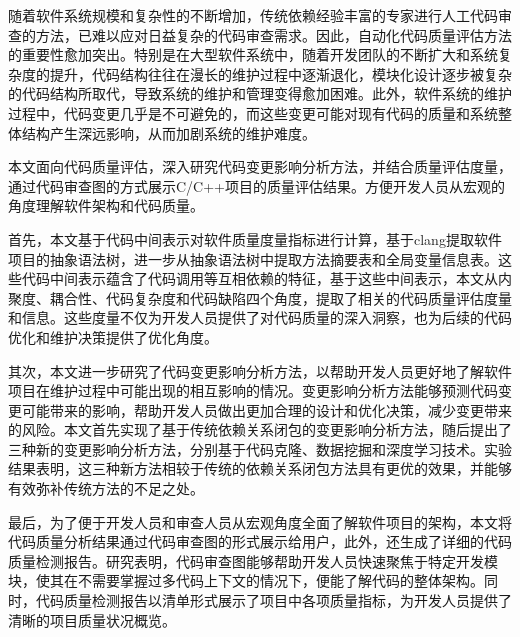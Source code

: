 \begin{cabstract}

  随着软件系统规模和复杂性的不断增加，传统依赖经验丰富的专家进行人工代码审查的方法，已难以应对日益复杂的代码审查需求。因此，自动化代码质量评估方法的重要性愈加突出。特别是在大型软件系统中，随着开发团队的不断扩大和系统复杂度的提升，代码结构往往在漫长的维护过程中逐渐退化，模块化设计逐步被复杂的代码结构所取代，导致系统的维护和管理变得愈加困难。此外，软件系统的维护过程中，代码变更几乎是不可避免的，而这些变更可能对现有代码的质量和系统整体结构产生深远影响，从而加剧系统的维护难度。

  本文面向代码质量评估，深入研究代码变更影响分析方法，并结合质量评估度量，通过代码审查图的方式展示C/C++项目的质量评估结果。方便开发人员从宏观的角度理解软件架构和代码质量。

  首先，本文基于代码中间表示对软件质量度量指标进行计算，基于clang提取软件项目的抽象语法树，进一步从抽象语法树中提取方法摘要表和全局变量信息表。这些代码中间表示蕴含了代码调用等互相依赖的特征，基于这些中间表示，本文从内聚度、耦合性、代码复杂度和代码缺陷四个角度，提取了相关的代码质量评估度量和信息。这些度量不仅为开发人员提供了对代码质量的深入洞察，也为后续的代码优化和维护决策提供了优化角度。

  其次，本文进一步研究了代码变更影响分析方法，以帮助开发人员更好地了解软件项目在维护过程中可能出现的相互影响的情况。变更影响分析方法能够预测代码变更可能带来的影响，帮助开发人员做出更加合理的设计和优化决策，减少变更带来的风险。本文首先实现了基于传统依赖关系闭包的变更影响分析方法，随后提出了三种新的变更影响分析方法，分别基于代码克隆、数据挖掘和深度学习技术。实验结果表明，这三种新方法相较于传统的依赖关系闭包方法具有更优的效果，并能够有效弥补传统方法的不足之处。

  最后，为了便于开发人员和审查人员从宏观角度全面了解软件项目的架构，本文将代码质量分析结果通过代码审查图的形式展示给用户，此外，还生成了详细的代码质量检测报告。研究表明，代码审查图能够帮助开发人员快速聚焦于特定开发模块，使其在不需要掌握过多代码上下文的情况下，便能了解代码的整体架构。同时，代码质量检测报告以清单形式展示了项目中各项质量指标，为开发人员提供了清晰的项目质量状况概览。
\end{cabstract}

